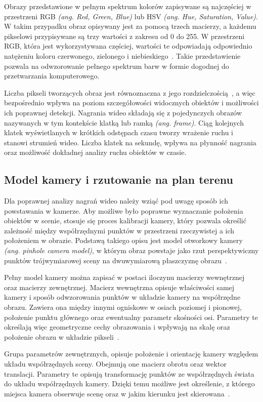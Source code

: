 Obrazy przedstawione w pełnym spektrum kolorów zapisywane są najczęściej w przestrzeni RGB
\textit{(ang. Red, Green, Blue)} lub HSV \textit{(ang. Hue, Saturation, Value)}. W takim przypadku
obraz opisywany jest za pomocą trzech macierzy, a każdemu pikselowi przypisywane są trzy wartości z
zakresu od 0 do 255. W przestrzeni RGB, która jest wykorzystywana częściej, wartości te odpowiadają
odpowiednio natężeniu koloru czerwonego, zielonego i niebieskiego~\cite{gonzalezwoods}. Takie
przedstawienie pozwala na odwzorowanie pełnego spektrum barw w formie dogodnej do przetwarzania
komputerowego.

Liczba pikseli tworzących obraz jest równoznaczna z jego rozdzielczością~\cite{gonzalezwoods}, a
więc bezpośrednio wpływa na poziom szczegółowości widocznych obiektów i możliwości ich poprawnej
detekcji. Nagrania wideo składają się z pojedynczych obrazów nazywanych w tym kontekście klatką lub
ramką \textit{(ang. frame)}. Ciąg kolejnych klatek wyświetlanych w krótkich odstępach czasu tworzy
wrażenie ruchu i stanowi strumień wideo. Liczba klatek na sekundę, wpływa na płynność nagrania oraz
możliwość dokładnej analizy ruchu obiektów w czasie.

\subsection{Model kamery i rzutowanie na plan terenu}
Dla poprawnej analizy nagrań wideo należy wziąć pod uwagę sposób ich powstawania w kamerze. Aby
możliwe było poprawne wyznaczanie położenia obiektów w scenie, stosuje się proces kalibracji
kamery, który pozwala określić zależność między współrzędnymi punktów w przestrzeni rzeczywistej a
ich położeniem w obrazie. Podstawą takiego opisu jest model otworkowy kamery \textit{(ang. pinhole
  camera model)}, w którym obraz powstaje jako rzut perspektywiczny punktów trójwymiarowej sceny na
dwuwymiarową płaszczyznę obrazu~\cite{hartleyzisserman}.

Pełny model kamery można zapisać w postaci iloczynu macierzy wewnętrznej oraz macierzy zewnętrznej.
Macierz wewnętrzna opisuje właściwości samej kamery i sposób odwzorowania punktów w układzie kamery
na współrzędne obrazu. Zawiera ona między innymi ogniskowe w osiach poziomej i pionowej, położenie
punktu głównego oraz ewentualny parametr skośności osi. Parametry te określają więc geometryczne
cechy obrazowania i wpływają na skalę oraz położenie obrazu w układzie pikseli~\cite{szeliski2022}.

Grupa parametrów zewnętrznych, opisuje położenie i orientację kamery względem układu współrzędnych
sceny. Obejmują one macierz obrotu oraz wektor translacji. Parametry te opisują transformację
punktów ze współrzędnych świata do układu współrzędnych kamery. Dzięki temu możliwe jest
określenie, z którego miejsca kamera obserwuje scenę oraz w jakim kierunku jest
skierowana~\cite{szeliski2022}.

